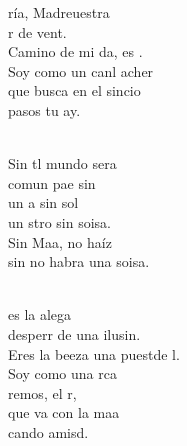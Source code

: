 \documentclass[12pt]{article}
\begin{document}
\begin{multicols*}{2}
\begin{cancion}%
	ría, Madreuestra\\
	r de vent.\\
	Camino de mi da,  es . \\
	Soy como un canl acher\\
	que busca en el sincio\\
	 pasos  tu ay. \\\jump\\
	\begin{chorus}%
	Sin tl mundo sera\\
	comun pae sin \\
	un a sin sol\\
	un stro sin soisa.\\
	Sin Maa, no haíz\\
	sin no habra una soisa.\\
	\end{chorus}%
	\jump\\
	es la alega \\
	desperr de una ilusin.\\
	Eres la beeza una puestde l.\\
	Soy como una rca\\
	 remos,  el r,\\
	que va con la maa\\
	cando  amisd.\\
\end{cancion}%


\end{multicols*}
\end{document}
